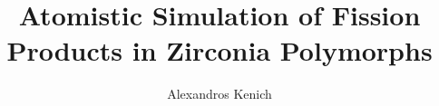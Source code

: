 \documentclass[a4paper,12pt,twoside]{report}
\begin{document}
\title{\LARGE {\bf Atomistic Simulation of Fission Products in Zirconia Polymorphs}\\
 \vspace*{6mm}
}

\author{Alexandros Kenich}

\normallinespacing
\maketitle



\preface


%
%

\body

\doublespacing









\label{References}
\renewcommand\bibname{References}



\appendix
\end{document}
